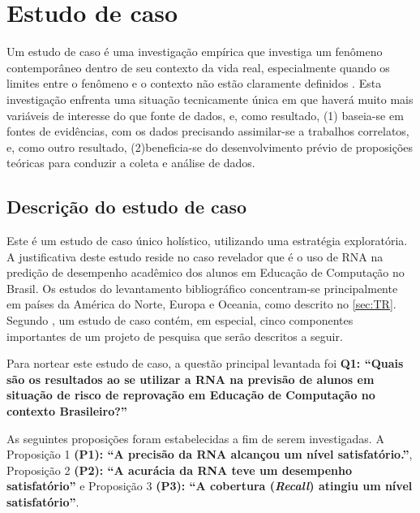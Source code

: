 \documentclass[
	12pt,				%
	openright,			%
	oneside,
	a4paper,			%
	english,			%
	french,				%
	spanish,			%
	brazil,				%
	]{abntex2}
\begin{document}
\section{Estudo de caso}
\label{sec:estudo}
Um estudo de caso é uma investigação empírica que investiga um fenômeno contemporâneo dentro de seu contexto da vida real, especialmente quando os limites entre o fenômeno e o contexto não estão claramente definidos \cite{yin2001planejamento}. Esta investigação enfrenta uma situação tecnicamente única em que haverá muito mais variáveis de interesse do que fonte de dados, e, como resultado, (1) baseia-se em fontes de evidências, com os dados precisando assimilar-se a trabalhos correlatos, e, como outro resultado, (2)beneficia-se do desenvolvimento prévio de proposições teóricas para conduzir a coleta e análise de dados.

\subsection{Descrição do estudo de caso}
Este é um estudo de caso único holístico, utilizando uma estratégia exploratória. A justiﬁcativa deste estudo reside no caso revelador que é o uso de RNA na predição de desempenho acadêmico dos alunos em Educação de Computação no Brasil. Os estudos do levantamento bibliográfico concentram-se principalmente em países da América do Norte, Europa e Oceania, como descrito no \autoref{sec:TR}.
Segundo , um estudo de caso contém, em especial, cinco componentes importantes de um projeto de pesquisa que serão descritos a seguir.

Para nortear este estudo de caso, a questão principal levantada foi \textbf{Q1: ``Quais são os resultados ao se utilizar a RNA na previsão de alunos em situação de risco de reprovação em Educação de Computação no contexto Brasileiro?''}

As seguintes proposições foram estabelecidas a fim de serem investigadas. A Proposição 1 \textbf{(P1): ``A precisão da RNA alcançou um nível satisfatório.''}, Proposição 2 \textbf{(P2): ``A acurácia da RNA teve um desempenho satisfatório''} e Proposição 3 \textbf{(P3): ``A cobertura (\textit{Recall}) atingiu um nível satisfatório''}.
\end{document}
